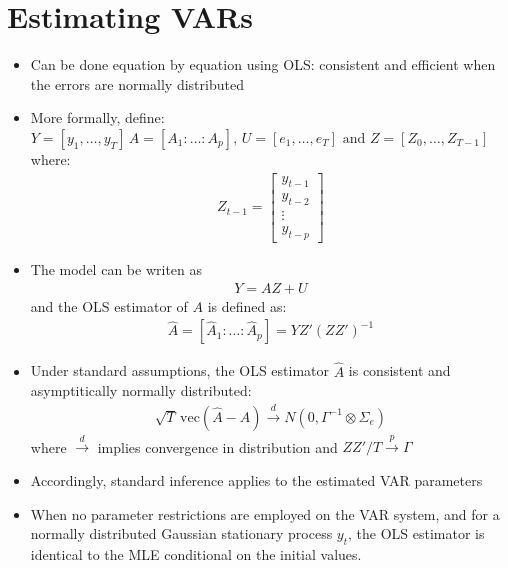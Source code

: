 \documentclass[10pt]{article}
\begin{document}
\section{Estimating VARs}
\begin{itemize}
    \item Can be done equation by equation using OLS: consistent and efficient when the errors are normally distributed 
    \item More formally, define: $Y = [y_1, \dots, y_T]\, A = [A_1: \dots: A_p],\, U = [e_1,\dots, e_T]\text{ and } Z = [Z_0, \dots, Z_{T - 1}] $ where: 
    \begin{gather*}
        Z_{t - 1}=
        \begin{bmatrix}
            y_{t - 1}\\
            y_{t - 2}\\
            \vdots\\
            y_{t - p}
        \end{bmatrix}
    \end{gather*}
    \item The model can be writen as 
    \begin{gather*}
        Y = AZ + U
    \end{gather*}
    and the OLS estimator of $A $ is defined as: 
    \begin{gather*}
        \hat{A} = [\hat{A}_1: \dots: \hat{A}_p] = YZ'(ZZ')^{-1}
    \end{gather*}
    \item Under standard assumptions, the OLS estimator $\hat{A} $ is consistent and asymptitically normally distributed: 
    \begin{gather*}
        \sqrt{T}\,\text{vec}\left(\hat{A} - A\right)\xrightarrow{d}N\left(0, \Gamma^{-1}\otimes\Sigma_e\right)
    \end{gather*}
    where $\xrightarrow{d} $ implies convergence in distribution and $ZZ' / T \xrightarrow{p}\Gamma $
    \item Accordingly, standard inference applies to the estimated VAR parameters
    \item When no parameter restrictions are employed on the VAR system, and for a normally distributed Gaussian stationary process $y_t $, the OLS estimator is identical to the MLE conditional on the initial values. 
\end{itemize}
\newpage 
\end{document}
